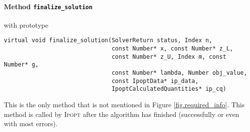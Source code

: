 \documentclass[10pt]{article}
\newcommand{\Ipopt}{\textsc{Ipopt}\xspace}
\begin{document}
\paragraph{Method \texttt{finalize\_solution}} with prototype

\begin{verbatim}
virtual void finalize_solution(SolverReturn status, Index n,
                               const Number* x, const Number* z_L,
                               const Number* z_U, Index m, const Number* g,
                               const Number* lambda, Number obj_value,
                               const IpoptData* ip_data,
                               IpoptCalculatedQuantities* ip_cq)
\end{verbatim}
This is the only method that is not mentioned in Figure
\ref{fig.required_info}. This method is called by \Ipopt after the
algorithm has finished (successfully or even with most errors).
\end{document}
